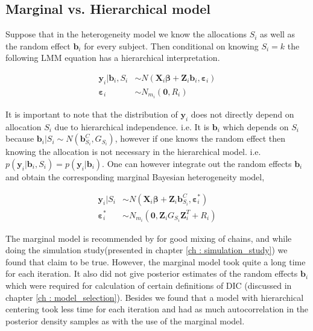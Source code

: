 \subsection{Marginal vs. Hierarchical model}
Suppose that in the heterogeneity model we know the allocations $S_i$ as well as the random effect $\boldsymbol{b}_i$ for every subject. Then conditional on knowing $S_i=k$ the following LMM equation has a hierarchical interpretation.

\begin{equation}
\begin{split}
\boldsymbol{y}_i|\boldsymbol{b}_{i}, S_i &\sim N(\boldsymbol{X}_{i}\boldsymbol{\beta} + \boldsymbol{Z}_{i}\boldsymbol{b}_{i},\boldsymbol{\varepsilon}_{i})\\ 
\boldsymbol{\varepsilon}_{i} &\sim N_{m_i}(\boldsymbol{0}, R_i)
\end{split}
\end{equation}

It is important to note that the distribution of $\boldsymbol{y}_i$ does not directly depend on allocation $S_i$ due to hierarchical independence. i.e. It is $\boldsymbol{b}_{i}$ which depends on $S_i$ because $\boldsymbol{b}_{i}|S_i \sim N(\boldsymbol{b}_{S_i}^C, G_{S_i})$, however if one knows the random effect then knowing the allocation is not necessary in the hierarchical model. i.e. $p(\boldsymbol{y}_i|\boldsymbol{b}_{i}, S_i) = p(\boldsymbol{y}_i|\boldsymbol{b}_{i})$. One can however integrate out the random effects $\boldsymbol{b}_{i}$ and obtain the corresponding marginal Bayesian heterogeneity model,

\begin{equation}
\begin{split}
\boldsymbol{y}_i|S_i &\sim N(\boldsymbol{X}_{i}\boldsymbol{\beta} + \boldsymbol{Z}_{i}\boldsymbol{b}_{S_i}^C, \boldsymbol{\varepsilon}_{i}^*)\\ 
\boldsymbol{\varepsilon}_{i}^* &\sim N_{m_i}(\boldsymbol{0}, \boldsymbol{Z}_{i}G_{S_i}\boldsymbol{Z}_{i}^T+ R_i)
\end{split}
\end{equation}

The marginal model is recommended by \citet{fruhwirth-schnatter_bayesian_2004} for good mixing of chains, and while doing the simulation study(presented in chapter \ref{ch : simulation_study}) we found that claim to be true. However, the marginal model took quite a long time for each iteration. It also did not give posterior estimates of the random effects $\boldsymbol{b}_i$ which were required for calculation of certain definitions of DIC (discussed in chapter \ref{ch : model_selection}). Besides we found that a model with hierarchical centering took less time for each iteration and had as much autocorrelation in the posterior density samples as with the use of the marginal model.

